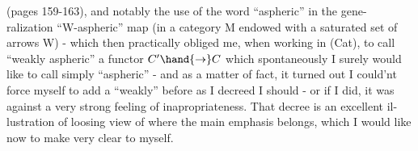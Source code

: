 
(pages 159-163),  and notably the use of the word ``aspheric'' in the gene-%
ralization ``W-aspheric'' map (in a category M endowed with a saturated
set of arrows W)  -  which then practically obliged me, when
working in (Cat),  to call ``weakly aspheric'' a functor $C'\hand{\to}C$  which 
 spontaneously I surely would like to call simply ``aspheric''  -
and as a matter of fact,  it turned out I could'nt force myself to add a
``weakly'' before as I decreed I should  -  or if I did,  it was against a
very strong feeling of inapropriateness.  That decree  is an excellent il-%
lustration of loosing view of where the main emphasis belongs,  which I
would like now to make very clear to myself.

